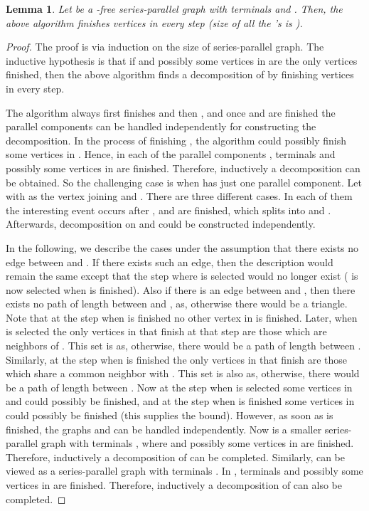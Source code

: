 \documentclass[11pt]{article}
\newtheorem{lemma}[theorem]{Lemma}
\begin{document}
\begin{lemma}  \label{spg}
Let  be a -free series-parallel graph with terminals  and . Then, the above algorithm finishes  vertices in every step (size of all the 's is ).
\end{lemma}
\begin{proof}
The proof is via induction on the size of series-parallel graph. The inductive hypothesis is that if  and possibly some vertices in  are the only vertices finished, then the above algorithm finds a decomposition of  by finishing  vertices in every step.

The algorithm always first finishes  and then , and once  and  are finished the parallel components can be handled independently for constructing the decomposition. In the process of finishing , the algorithm could possibly finish some vertices in . Hence, in each of the parallel components , terminals  and possibly some vertices in  are finished. Therefore, inductively a decomposition can be obtained. So the challenging case is when  has just one parallel component. Let  with  as the vertex joining  and . There are three different cases. In each of them the interesting event occurs after , and  are finished, which splits  into  and . Afterwards, decomposition on  and  could be constructed independently.

In the following, we describe the cases under the assumption that there exists no edge between  and . If there exists such an edge, then the description would remain the same except that the step where  is selected would no longer exist ( is now selected when  is finished). Also if there is an edge between  and , then there exists no path of length  between  and , as, otherwise there would be a triangle. \\

 Note that at the step when  is finished no other vertex in  is finished. Later, when  is selected the only vertices in  that finish at that step are those which are neighbors of . This set is  as, otherwise, there would be a path of length  between . Similarly, at the step when  is finished the only vertices in  that finish are those which share a common neighbor with . This set is also  as, otherwise, there would be a path of length  between . Now at the step when  is selected some vertices in  and   could possibly be finished, and at the step when  is finished some vertices in  could possibly be finished (this supplies the  bound). However, as soon as  is finished, the graphs  and  can be handled independently. Now  is a smaller series-parallel graph with terminals , where  and possibly some vertices in  are finished. Therefore, inductively a decomposition of  can be completed. Similarly,  can be viewed as a series-parallel graph with terminals . In , terminals  and possibly some vertices in  are finished. Therefore, inductively a decomposition of  can also be completed. 
\newline



\end{proof}
\end{document}
